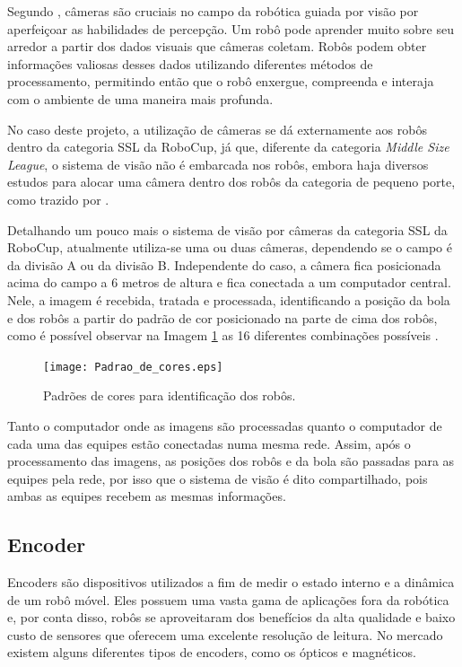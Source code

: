 \documentclass[acronym, symbols, table]{fei}
\begin{document}
				Segundo \textcite{cameras_technexion}, câmeras são cruciais no campo da robótica guiada por visão por aperfeiçoar as habilidades de percepção. Um robô pode aprender muito sobre seu arredor a partir dos dados visuais que câmeras coletam. Robôs podem obter informações valiosas desses dados utilizando diferentes métodos de processamento, permitindo então que o robô enxergue, compreenda e interaja com o ambiente de uma maneira mais profunda.
				
				No caso deste projeto, a utilização de câmeras se dá externamente aos robôs dentro da categoria SSL da RoboCup, já que, diferente da categoria \textit{Middle Size League}, o sistema de visão não é embarcada nos robôs, embora haja diversos estudos para alocar uma câmera dentro dos robôs da categoria de pequeno porte, como trazido por \textcite{melo2022embedded}.
				
				Detalhando um pouco mais o sistema de visão por câmeras da categoria SSL da RoboCup, atualmente utiliza-se uma ou duas câmeras, dependendo se o campo é da divisão A ou da divisão B. Independente do caso, a câmera fica posicionada acima do campo a 6 metros de altura e fica conectada a um computador central. Nele, a imagem é recebida, tratada e processada, identificando a posição da bola e dos robôs a partir do padrão de cor posicionado na parte de cima dos robôs, como é possível observar na Imagem \ref{fig:color_patterns} as 16 diferentes combinações possíveis \cite{10.1007/978-3-642-11876-0_37}.
				
				\begin{figure}[!htb]
					\centering
					\caption{Padrões de cores para identificação dos robôs.} 
					\texttt{[image: Padrao\_de\_cores.eps]}
					\label{fig:color_patterns}
				\end{figure}
			
				Tanto o computador onde as imagens são processadas quanto o computador de cada uma das equipes estão conectadas numa mesma rede. Assim, após o processamento das imagens, as posições dos robôs e da bola são passadas para as equipes pela rede, por isso que o sistema de visão é dito compartilhado, pois ambas as equipes recebem as mesmas informações.
			
			\subsection{Encoder}\label{sec:sensores_encoders}
				
				Encoders são dispositivos utilizados a fim de medir o estado interno e a dinâmica de um robô móvel. Eles possuem uma vasta gama de aplicações fora da robótica e, por conta disso, robôs se aproveitaram dos benefícios da alta qualidade e baixo custo de sensores que oferecem uma excelente resolução de leitura. No mercado existem alguns diferentes tipos de encoders, como os ópticos e magnéticos. 
				
\end{document}
